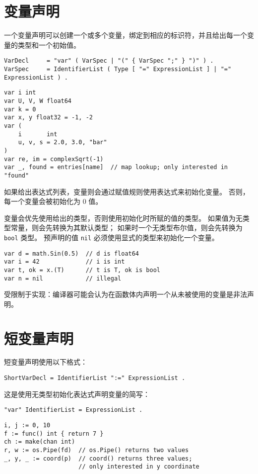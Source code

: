 \section{变量声明}
一个变量声明可以创建一个或多个变量，绑定到相应的标识符，并且给出每一个变量的类型和一个初始值。
\begin{lstlisting}[style=EBNF]
VarDecl     = "var" ( VarSpec | "(" { VarSpec ";" } ")" ) .
VarSpec     = IdentifierList ( Type [ "=" ExpressionList ] | "=" ExpressionList ) .
\end{lstlisting}

\begin{lstlisting}[style=golang]
var i int
var U, V, W float64
var k = 0
var x, y float32 = -1, -2
var (
	i       int
	u, v, s = 2.0, 3.0, "bar"
)
var re, im = complexSqrt(-1)
var _, found = entries[name]  // map lookup; only interested in "found"
\end{lstlisting}
如果给出表达式列表，变量则会通过赋值规则使用表达式来初始化变量。
否则，每一个变量会被初始化为 0 值。

变量会优先使用给出的类型，否则使用初始化时所赋的值的类型。
如果值为无类型常量，则会先转换为其默认类型；
如果时一个无类型布尔值，则会先转换为 \lstinline|bool| 类型。
预声明的值 \lstinline|nil| 必须使用显式的类型来初始化一个变量。
\begin{lstlisting}[style=golang]
var d = math.Sin(0.5)  // d is float64
var i = 42             // i is int
var t, ok = x.(T)      // t is T, ok is bool
var n = nil            // illegal
\end{lstlisting}

受限制于实现：编译器可能会认为在函数体内声明一个从未被使用的变量是非法声明。

\section{短变量声明}
短变量声明使用以下格式：
\begin{lstlisting}[style=EBNF]
ShortVarDecl = IdentifierList ":=" ExpressionList .
\end{lstlisting}
这是使用无类型初始化表达式声明变量的简写：
\begin{lstlisting}[style=EBNF]
"var" IdentifierList = ExpressionList .
\end{lstlisting}

\begin{lstlisting}[style=golang]
i, j := 0, 10
f := func() int { return 7 }
ch := make(chan int)
r, w := os.Pipe(fd)  // os.Pipe() returns two values
_, y, _ := coord(p)  // coord() returns three values; 
					 // only interested in y coordinate
\end{lstlisting}


